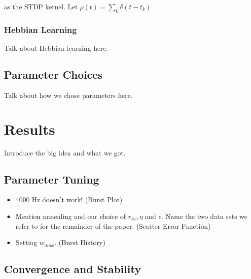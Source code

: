 \documentclass[12pt, final]{article}
\begin{document}
as the STDP kernel. Let \(\rho(t) = \sum_{k} \delta(t - t_k)\)

\subsubsection{Hebbian Learning}

Talk about Hebbian learning here.

\subsection{Parameter Choices}

Talk about how we chose parameters here.

\section{Results}

Introduce the big idea and what we got.

\subsection{Parameter Tuning}

\begin{itemize}
\item 4000 Hz doesn't work! (Burst Plot)

\item Mention annealing and our choice of \(r_{in}, \eta\) and \(\epsilon\). Name the two data sets we refer to for the remainder of the paper. (Scatter Error Function)

\item Setting \(w_{max}\). (Burst History)
\end{itemize}

\subsection{Convergence and Stability}
\end{document}

